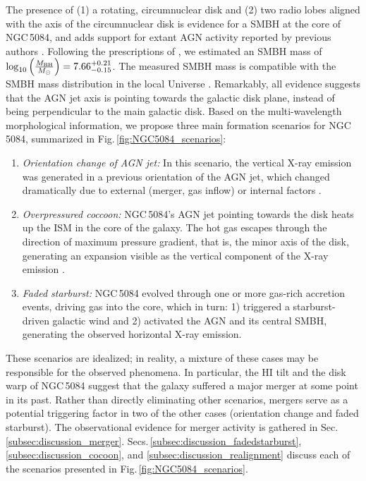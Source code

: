 \documentclass[modern]{aastex631}
\begin{document}
The presence of (1) a rotating, circumnuclear disk and (2) two radio lobes aligned with the axis of the circumnuclear disk is evidence for a SMBH at the core of NGC\,5084, and adds support for extant AGN activity reported by previous authors \citep{kewley+2001apj556_121}. Following the prescriptions of \citet{smith+2021mnras500_1933}, we estimated an SMBH mass of $\log_{10}\left( \frac{M_{\rm BH}}{M_{\odot}} \right) = 7.66^{+0.21}_{-0.15}$. The measured SMBH mass is compatible with the SMBH mass distribution in the local Universe \citep{vika+2009mnras400_1451, smith+2021mnras500_1933}. Remarkably, all evidence suggests that the AGN jet axis is pointing towards the galactic disk plane, instead of being perpendicular to the main galactic disk. Based on the multi-wavelength morphological information, we propose three main formation scenarios for NGC\,5084, summarized in Fig.\,\ref{fig:NGC5084_scenarios}:

\begin{enumerate}
    \item \emph{Orientation change of AGN jet:} In this scenario, the vertical X-ray emission was generated in a previous orientation of the AGN jet, which changed dramatically due to external (merger, gas inflow) or internal factors \citep[AGN precession, ][]{britzen+2018mnras478_3199, britzen+2023apj951_106}. 


    \item \emph{Overpressured coccoon:} NGC\,5084's AGN jet pointing towards the disk heats up the ISM in the core of the galaxy. The hot gas escapes through the direction of maximum pressure gradient, that is, the minor axis of the disk, generating an expansion visible as the vertical component of the X-ray emission \citep[see Fig.\,5 in][]{capetti+2002aap394_39}. 
    
    \item \emph{Faded starburst:} NGC\,5084 evolved through one or more gas-rich accretion events, driving gas into the core, which in turn: 1) triggered a starburst-driven galactic wind \citep{hodgeskluck+2020apj903_35} and 2) activated the AGN and its central SMBH, generating the observed horizontal X-ray emission.  
\end{enumerate}

These scenarios are idealized; in reality, a mixture of these cases may be responsible for the observed phenomena. In particular, the HI tilt and the disk warp of NGC\,5084 suggest that the galaxy suffered a major merger at some point in its past. Rather than directly eliminating other scenarios, mergers serve as a potential triggering factor in two of the other cases (orientation change and faded starburst). The observational evidence for merger activity is gathered in Sec.\,\ref{subsec:discussion_merger}. Secs.\,\ref{subsec:discussion_fadedstarburst}, \ref{subsec:discussion_cocoon}, and \ref{subsec:discussion_realignment} discuss each of the scenarios presented in Fig.\,\ref{fig:NGC5084_scenarios}.
\end{document}
